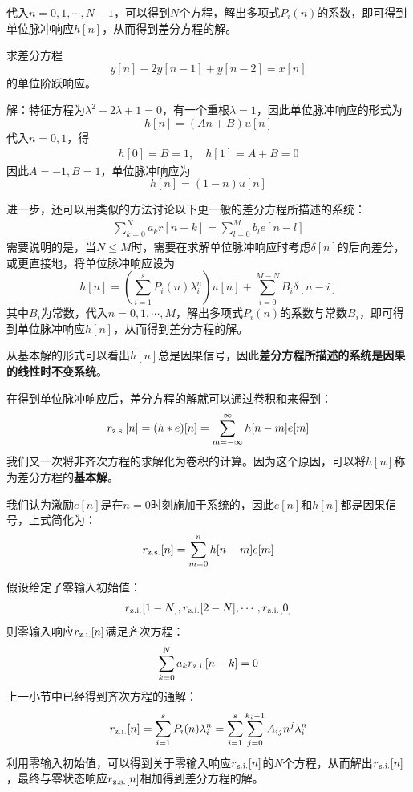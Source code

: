 代入$n=0,1,\cdots,N-1$，可以得到$N$个方程，解出多项式$P_i(n)$的系数，即可得到单位脉冲响应$h[n]$，从而得到差分方程的解。

\begin{example}
    求差分方程
    $$y[n]-2y[n-1]+y[n-2]=x[n]$$
    的单位阶跃响应。

    解：特征方程为$\lambda^2-2\lambda+1=0$，有一个重根$\lambda=1$，因此单位脉冲响应的形式为
    $$h[n]=(A n+B)u[n]$$
    代入$n=0,1$，得\begin{align*}
    h[0]=B=1,\quad h[1]=A+B=0
    \end{align*}
    因此$A=-1,B=1$，单位脉冲响应为
    $$h[n]=(1-n)u[n]$$
\end{example}

进一步，还可以用类似的方法讨论以下更一般的差分方程所描述的系统：
\begin{align*}
    \sum_{k=0}^{N}a_k r[n-k] = \sum_{l=0}^{M}b_l e[n-l]
\end{align*}
需要说明的是，当$N\leq M$时，需要在求解单位脉冲响应时考虑$\delta[n]$的后向差分，或更直接地，将单位脉冲响应设为
$$h[n]=\left(\sum_{i=1}^s P_i(n) \lambda_i^n \right)u[n]+\sum_{i=0}^{M-N}B_i\delta[n-i]$$
其中$B_i$为常数，代入$n=0,1,\cdots,M$，解出多项式$P_i(n)$的系数与常数$B_i$，即可得到单位脉冲响应$h[n]$，从而得到差分方程的解。

从基本解的形式可以看出$h[n]$总是因果信号，因此\textbf{差分方程所描述的系统是因果的线性时不变系统}。

在得到单位脉冲响应后，差分方程的解就可以通过卷积和来得到：
\begin{align*}
    r_{\operatorname{z.s.}}[n]=(h*e)[n]=\sum_{m=-\infty}^{\infty}h[n-m]e[m]
\end{align*}
我们又一次将非齐次方程的求解化为卷积的计算。因为这个原因，可以将$h[n]$称为差分方程的\textbf{基本解}。

我们认为激励$e[n]$是在$n=0$时刻施加于系统的，因此$e[n]$和$h[n]$都是因果信号，上式简化为：
\begin{align*}
    r_{\operatorname{z.s.}}[n]=\sum_{m=0}^{n}h[n-m]e[m]
\end{align*}

假设给定了零输入初始值：
\begin{align*}
    r_{\operatorname{z.i.}}[1-N],r_{\operatorname{z.i.}}[2-N],\cdots,r_{\operatorname{z.i.}}[0]
\end{align*}
则零输入响应$r_{\operatorname{z.i.}}[n]$满足齐次方程：
\begin{align*}
    \sum_{k=0}^{N}a_k r_{\operatorname{z.i.}}[n-k] = 0
\end{align*}
上一小节中已经得到齐次方程的通解：
\begin{align*}
    r_{\operatorname{z.i.}}[n]=\sum_{i=1}^{s}P_i(n) \lambda_i^n=\sum_{i=1}^{s}\sum_{j=0}^{k_i-1}A_{ij} n^j \lambda_i^n
\end{align*}
利用零输入初始值，可以得到关于零输入响应$r_{\operatorname{z.i.}}[n]$的$N$个方程，从而解出$r_{\operatorname{z.i.}}[n]$，最终与零状态响应$r_{\operatorname{z.s.}}[n]$相加得到差分方程的解。

